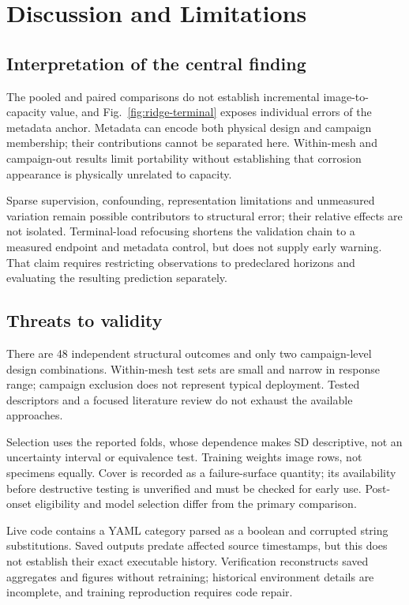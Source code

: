 \documentclass[conference]{IEEEtran}
\begin{document}
\section{Discussion and Limitations}
\subsection{Interpretation of the central finding}
The pooled and paired comparisons do not establish incremental image-to-capacity value, and Fig.~\ref{fig:ridge-terminal} exposes individual errors of the metadata anchor. Metadata can encode both physical design and campaign membership; their contributions cannot be separated here. Within-mesh and campaign-out results limit portability without establishing that corrosion appearance is physically unrelated to capacity.

Sparse supervision, confounding, representation limitations and unmeasured variation remain possible contributors to structural error; their relative effects are not isolated. Terminal-load refocusing shortens the validation chain to a measured endpoint and metadata control, but does not supply early warning. That claim requires restricting observations to predeclared horizons and evaluating the resulting prediction separately.

\subsection{Threats to validity}
There are 48 independent structural outcomes and only two campaign-level design combinations. Within-mesh test sets are small and narrow in response range; campaign exclusion does not represent typical deployment. Tested descriptors and a focused literature review do not exhaust the available approaches.

Selection uses the reported folds, whose dependence makes SD descriptive, not an uncertainty interval or equivalence test. Training weights image rows, not specimens equally. Cover is recorded as a failure-surface quantity; its availability before destructive testing is unverified and must be checked for early use. Post-onset eligibility and model selection differ from the primary comparison.

Live code contains a YAML category parsed as a boolean and corrupted string substitutions. Saved outputs predate affected source timestamps, but this does not establish their exact executable history. Verification reconstructs saved aggregates and figures without retraining; historical environment details are incomplete, and training reproduction requires code repair.
\end{document}
